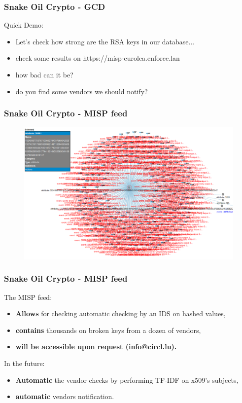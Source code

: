 \begin{frame}
   \frametitle{Snake Oil Crypto - GCD}

   Quick Demo:
   \begin{itemize}
   \item Let's check how strong are the RSA keys in our database...
   \item check some results on https://misp-eurolea.enforce.lan
   \item how bad can it be?
   \item do you find some vendors we should notify?
   \end{itemize}

\end{frame}

\begin{frame}
   \frametitle{Snake Oil Crypto - MISP feed}
\begin{figure}
\centering
\includegraphics[width=\textwidth]{misp.png}
\end{figure}
\end{frame}

\begin{frame}
   \frametitle{Snake Oil Crypto - MISP feed}
   The MISP feed:
   \begin{itemize}
     \item {\bf Allows} for checking automatic checking by an IDS on hashed values,
     \item {\bf contains} thousands on broken keys from a dozen of vendors,
     \item {\bf will be accessible upon request (info@circl.lu).}
   \end{itemize}

   In the future:
    \begin{itemize}
     \item {\bf Automatic} the vendor checks by performing TF-IDF on x509's subjects, 
     \item {\bf automatic} vendors notification.
    \end{itemize}

\end{frame}
